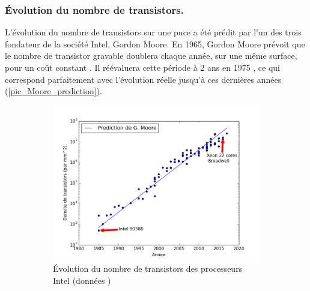 \subsubsection{Évolution du nombre de transistors.}
L'évolution du nombre de transistors sur une puce a été prédit par l'un des trois fondateur de la société Intel, Gordon Moore. En 1965, Gordon Moore prévoit que le nombre de transistor gravable doublera chaque année, sur une même surface, pour un coût constant \cite{Moore1998}. Il réévaluera cette période à 2 ans en 1975 \cite{Moore75}, ce qui correspond parfaitement avec l'évolution réelle jusqu'à ces dernières années (\autoref{pic_Moore_prediction}). 



\begin{figure}
    \begin{subfigure}[]{0.48\linewidth}\centering
        \vspace{1cm}
        \includegraphics[width=\linewidth]{images/Chapitre1/Moore_prediction.png}
        \caption{\label{pic_Moore_prediction} Évolution du nombre de transistors des processeurs Intel (données \cite{Wikipedia2019Transistor})}
    \end{subfigure}
    ~ %
    \begin{subfigure}[]{0.48\linewidth}\centering

\end{subfigure}
\end{figure}
